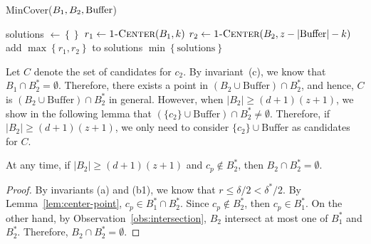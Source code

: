 \documentclass[envcountsame]{cls/cccg15}
\newcommand{\cp}{c_p}
\newcommand{\dz}{(d + 1)(z + 1)}
\newcommand{\Buffer}{\ensuremath{\text{Buffer}}}
\newcommand{\Call}[2]{\textsc{#1}(#2)}
\newcommand{\set}[1]{\left\{ #1 \right\}}
\newcommand{\card}[1]{\left|{#1}\right|}
\newcommand{\lee}{\leqslant}
\newcommand{\gee}{\geqslant}
\renewcommand{\leq}{\lee}
\renewcommand{\geq}{\gee}
\renewcommand{\ge}{\gee}
\begin{document}
\begin{algorithm}
\caption{\sc MinCover($B_1, B_2, \text{\rm Buffer}$)} 
\label{alg:compute-min}
\begin{algorithmic}[1]
	\STATE solutions $\gets \set{}$
	\FOR{$k \gets 0, \dots,(z - \card{\mbox{Buffer}})$}
		\STATE $r_1 \gets \Call{1-Center}{B_1, k}$
		\STATE $r_2 \gets \Call{1-Center}{B_2, z - \card{\mbox{Buffer}} - k}$
		\STATE add $\max \set{r_1, r_2}$ to solutions
	\ENDFOR
	\RETURN $\min\set{\text{solutions}}$
\end{algorithmic}
\end{algorithm}


Let $C$ denote the set of candidates for $c_2$.
By invariant~(c), we know that $B_1 \cap B_2^* = \emptyset$. 
Therefore, there exists a point in $(B_2 \cup \Buffer) \cap B_2^*$,
and hence, $C$ is $(B_2 \cup \Buffer) \cap B_2^*$ in general.
However, when $|B_2| \geq \dz$, 
we show in the following lemma that $(\{c_2\} \cup \Buffer) \cap B_2^* \neq \emptyset$. 
Therefore, if $|B_2| \ge \dz$, 
we only need to consider $\{c_2\} \cup \Buffer$ as candidates for $C$.



\begin{lemma}
\label{lem:B2dz}
	At any time, 
	if $|B_2| \ge \dz$ and $\cp \not\in B_2^*$,
	then $B_2 \cap B_2^* = \emptyset$.
\end{lemma}

\begin{proof}
	By invariants (a) and (b1), we know that $r \leq \delta/2 < \delta^*/2$. 
	By Lemma~\ref{lem:center-point}, $c_p \in B_1^* \cap B_2^*$. 
	Since $c_p \not \in B_2^*$, then $c_p \in B_1^*$. 
	On the other hand, by Observation~\ref{obs:intersection}, 
	$B_2$ intersect at most one of $B_1^*$ and $B_2^*$. 
	Therefore, $B_2 \cap B_2^* = \emptyset$.
\end{proof}
\end{document}
